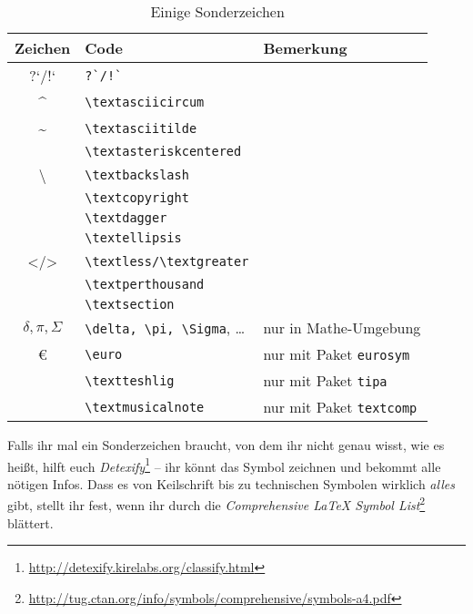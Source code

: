 \begin{table}[H]
	\center
	\begin{tabular}{cll}
		\toprule
		Zeichen & Code & Bemerkung \\
		\midrule
		?`/!` & \verb|?`/!`| & \\
		\textasciicircum & \verb|\textasciicircum| & \\
		\textasciitilde & \verb|\textasciitilde| & \\
		\textasteriskcentered & \verb|\textasteriskcentered| & \\
		\textbackslash & \verb|\textbackslash| & \\
		\textcopyright & \verb|\textcopyright| & \\
		\textdagger & \verb|\textdagger| & \\
		\textellipsis & \verb|\textellipsis| & \\
		\textless/\textgreater & \verb|\textless/\textgreater| & \\
		\textperthousand & \verb|\textperthousand| & \\
		\textsection & \verb|\textsection| & \\
		$\delta, \pi, \Sigma$ & \verb|\delta, \pi, \Sigma|, … & nur in Mathe-Umgebung \\
		\euro & \verb|\euro| & nur mit Paket \texttt{eurosym} \\
		\textteshlig & \verb|\textteshlig| & nur mit Paket \texttt{tipa} \\
		\textmusicalnote & \verb|\textmusicalnote| & nur mit Paket \texttt{textcomp} \\
		\bottomrule
	\end{tabular}
	\caption{Einige Sonderzeichen}
	\label{tbl:special-characters}
\end{table}
Falls ihr mal ein Sonderzeichen braucht, von dem ihr nicht genau wisst, wie es heißt, hilft euch \emph{Detexify}\footnote{\url{http://detexify.kirelabs.org/classify.html}} – ihr könnt das Symbol zeichnen und bekommt alle nötigen Infos.
Dass es von Keilschrift bis zu technischen Symbolen wirklich \emph{alles} gibt, stellt ihr fest, wenn ihr durch die \emph{Comprehensive \LaTeX{} Symbol List}\footnote{\url{http://tug.ctan.org/info/symbols/comprehensive/symbols-a4.pdf}} blättert.

